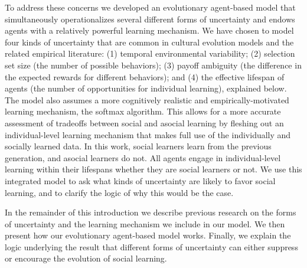 \documentclass[letterpaper,11.5pt]{scrartcl}
\begin{document}
To address these concerns we developed an evolutionary agent-based model that
simultaneously operationalizes several different forms of uncertainty and endows agents
with a relatively powerful learning mechanism. We have chosen to model four kinds of
uncertainty that are common in cultural evolution models and the related empirical
literature:  (1) temporal environmental variability; (2) selection set size (the number of
possible behaviors); (3) payoff ambiguity (the difference in the expected rewards for
different behaviors); and (4) the effective lifespan of agents (the number of
opportunities for individual learning), explained below. The model also assumes a more
cognitively realistic and empirically-motivated learning mechanism, the softmax algorithm.
This allows for a more accurate assessment of tradeoffs between 
social and asocial learning
by fleshing out an individual-level learning mechanism that makes full use of 
the individually and socially learned data. 
In this work, social learners learn from the previous generation, and 
asocial learners do not. All agents engage in individual-level learning within
their lifespans whether they are social learners or not.
We use this integrated model to ask what kinds of uncertainty are likely to
favor social learning, and to clarify the logic of why this would be the case.  

In the remainder of this introduction we describe previous research on the forms of uncertainty and the learning mechanism we include in our model. We then present how our evolutionary agent-based model works. Finally, we explain the logic underlying the result that different forms of uncertainty can either suppress or encourage the evolution of social learning. 
\end{document}
